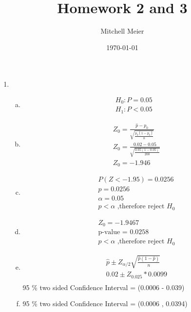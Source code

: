 \documentclass[14pt]{article}
\title{Homework 2 and 3}
\author{Mitchell Meier}
\date{\today}
\begin{document}
\maketitle

\begin{enumerate}

\item

\begin{enumerate}[(a)]
\item

\begin{align*}
H_0: P = 0.05 \\[15pt]
H_1: P < 0.05
\end{align*}

\item
\begin{align*}
& Z_0 = \frac{\hat{p} - p_0}{\sqrt{\frac{p_0 (1 - p_0)}{n}}} \\[15pt]
& Z_0 = \frac{0.02 - 0.05}{\sqrt{\frac{0.05 (1 - 0.05)}{200}}} \\[15pt]
& Z_0 = -1.946
\end{align*}

\item
\begin{align*}
& P(Z < -1.95) = 0.0256 \\[15pt]
& p = 0.0256 \\[15pt]
& \alpha = 0.05 \\[15pt]
& p < \alpha \text{ ,therefore reject } H_0
\end{align*}

\item
\begin{align*}
& Z_0 = -1.9467 \\[15pt]
& \text{p-value = } 0.0258 \\[15pt]
& p < \alpha \text{ ,therefore reject } H_0
\end{align*}

\item
\begin{align*}
& \hat{p} \pm Z_{\alpha / 2} \sqrt{\frac{\hat{p}(1-\hat{p})}{n}} \\[15pt]
& 0.02 \pm Z_{0.025} * 0.0099 \\[15pt]
\end{align*}
95 \% two sided Confidence Interval = (0.0006 - 0.039)

\item
95 \% two sided Confidence Interval = (0.0006 , 0.0394)



\end{enumerate}
\end{enumerate}
\end{document}
